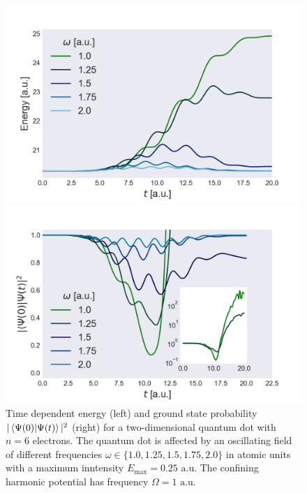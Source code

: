 \begin{figure}
    \centering
    \begin{minipage}{0.49\textwidth}
        \includegraphics[trim=2em 0em 5em 0em, width=\textwidth]{results/figures/2D/resonance/n6resonance.png} 
    \end{minipage}\hfill
    \begin{minipage}{0.49\textwidth}
        \includegraphics[trim=0em 0em 5em 0em, width=\textwidth]{results/figures/2D/resonance/n6_overlap_res.png} 
    \end{minipage}
    \caption{Time dependent energy (left) and ground state probability $|\braket{\Psi(0)}{\Psi(t)}|^2$
        (right) for a two-dimensional quantum dot with $n=6$ electrons. The quantum dot 
        is affected by an oscillating field of different frequencies
        $\omega\in\{1.0, 1.25, 1.5, 1.75, 2.0\}$ in atomic units with a maximum inntensity
        $E_\text{max} = 0.25 \text{ a.u.}$ The confining harmonic potential has frequency
        $\Omega=1 \text{ a.u.}$
    }
    \label{fig:2d_resonance_n6}
\end{figure}


